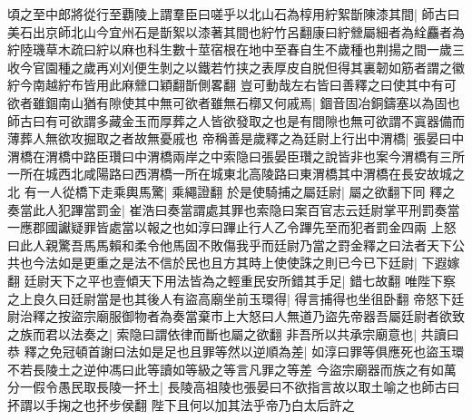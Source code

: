 頃之至中郎將從行至覇陵上謂羣臣曰嗟乎以北山石為椁用紵絮斮陳漆其間|{
	師古曰美石出京師北山今宜州石是斮絮以漆著其間也紵竹呂翻康曰紵檾屬細者為絟麤者為紵陸璣草木疏曰紵以麻也科生數十莖宿根在地中至春自生不歲種也荆揚之間一歲三收今官園種之歲再刈刈便生剝之以鐵若竹挟之表厚皮自脱但得其裏韌如筋者謂之徽紵今南越紵布皆用此麻檾口穎翻斮側畧翻}
豈可動哉左右皆曰善釋之曰使其中有可欲者雖錮南山猶有隙使其中無可欲者雖無石槨又何戚焉|{
	錮音固冶銅鑄塞以為固也師古曰有可欲謂多藏金玉而厚葬之人皆欲發取之也是有間隙也無可欲謂不寘器備而薄葬人無欲攻掘取之者故無憂戚也}
帝稱善是歲釋之為廷尉上行出中渭橋|{
	張晏曰中渭橋在渭橋中路臣瓚曰中渭橋兩岸之中索隐曰張晏臣瓚之說皆非也案今渭橋有三所一所在城西北咸陽路曰西渭橋一所在城東北高陵路曰東渭橋其中渭橋在長安故城之北}
有一人從橋下走乘輿馬驚|{
	乘繩證翻}
於是使騎捕之屬廷尉|{
	屬之欲翻下同}
釋之奏當此人犯蹕當罰金|{
	崔浩曰奏當謂處其罪也索隐曰案百官志云廷尉掌平刑罰奏當一應郡國讞疑罪皆處當以報之也如淳曰蹕止行人乙令蹕先至而犯者罰金四兩}
上怒曰此人親驚吾馬馬賴和柔令他馬固不敗傷我乎而廷尉乃當之罸金釋之曰法者天下公共也今法如是更重之是法不信於民也且方其時上使使誅之則已今已下廷尉|{
	下遐嫁翻}
廷尉天下之平也壹傾天下用法皆為之輕重民安所錯其手足|{
	錯七故翻}
唯陛下察之上良久曰廷尉當是也其後人有盜高廟坐前玉環得|{
	得言捕得也坐徂卧翻}
帝怒下廷尉治釋之按盜宗廟服御物者為奏當棄市上大怒曰人無道乃盜先帝器吾屬廷尉者欲致之族而君以法奏之|{
	索隐曰謂依律而斷也屬之欲翻}
非吾所以共承宗廟意也|{
	共讀曰恭}
釋之免冠頓首謝曰法如是足也且罪等然以逆順為差|{
	如淳曰罪等俱應死也盜玉環不若長陵土之逆仲馮曰此等讀如等級之等言凡罪之等差}
今盜宗廟器而族之有如萬分一假令愚民取長陵一抔土|{
	長陵高祖陵也張晏曰不欲指言故以取土喻之也師古曰抔謂以手掬之也抔步侯翻}
陛下且何以加其法乎帝乃白太后許之

